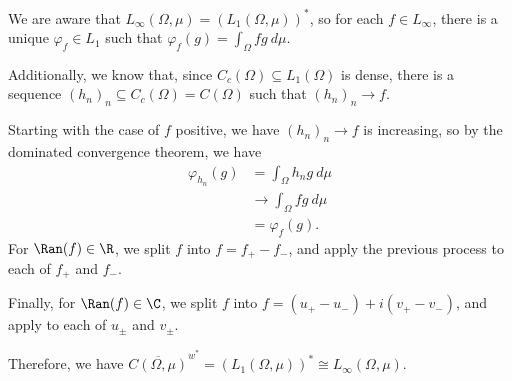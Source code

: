\documentclass[10pt]{mypackage}
\begin{document}
\begin{solution}[]
  We are aware that $L_{\infty}\left(\Omega,\mu\right) = \left(L_{1}\left(\Omega,\mu\right)\right)^{\ast}$, so for each $f\in L_{\infty}$, there is a unique $\varphi_{f}\in L_{1}$ such that $\varphi_{f}(g) = \int_{\Omega}fg\:d\mu$.\newline

  Additionally, we know that, since $C_c\left(\Omega\right)\subseteq L_{1}\left(\Omega\right)$ is dense, there is a sequence $\left(h_n\right)_n\subseteq C_c\left(\Omega\right) = C\left(\Omega\right)$ such that $\left(h_n\right)_n\rightarrow f$.\newline

  Starting with the case of $f$ positive, we have $\left(h_n\right)_n\rightarrow f$ is increasing, so by the dominated convergence theorem, we have
  \begin{align*}
    \varphi_{h_n}\left(g\right) &= \int_{\Omega}^{} h_n g\:d\mu\\
                                &\rightarrow \int_{\Omega}^{} f g\:d\mu\\
                                &= \varphi_{f}\left(g\right).
  \end{align*}
  For $\Ran(f)\in \R$, we split $f$ into $f = f_{+} - f_{-}$, and apply the previous process to each of $f_{+}$ and $f_{-}$.\newline

  Finally, for $\Ran(f) \in \C$, we split $f$ into $f = \left(u_{+} - u_{-}\right) + i\left(v_{+} - v_{-}\right)$, and apply to each of $u_{\pm}$ and $v_{\pm}$.\newline

  Therefore, we have $\overline{C\left(\Omega,\mu\right)}^{w^{\ast}} = \left(L_{1}\left(\Omega,\mu\right)\right)^{\ast}\cong L_{\infty}\left(\Omega,\mu\right)$.
\end{solution}
\end{document}
